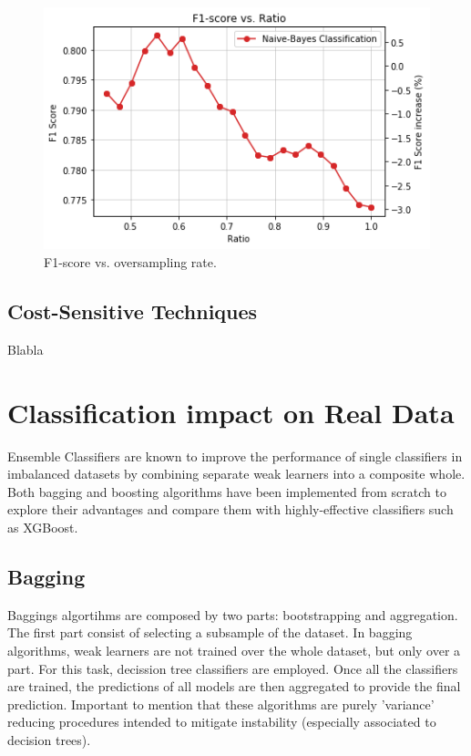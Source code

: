 \documentclass[conference]{IEEEtran}
\begin{document}
	\begin{figure}[h]
		\includegraphics[scale=0.3]{Oversampling_F1_Score}
		\centering
		\caption{F1-score vs. oversampling rate.}
		\label{fig:Oversampling_F1_Score}
	\end{figure}

	\subsection{Cost-Sensitive Techniques}
	Blabla

\section{Classification impact on Real Data}
Ensemble Classifiers are known to improve the performance of single classifiers in imbalanced datasets \cite{ensembles_review} by combining separate weak learners into a composite whole. Both bagging and boosting algorithms have been implemented from scratch to explore their advantages and compare them with highly-effective classifiers such as XGBoost. 

\subsection{Bagging}
Baggings algortihms are composed by two parts: bootstrapping and aggregation. The first part consist of selecting a subsample of the dataset. In bagging algorithms, weak learners are not trained over the whole dataset, but only over a part. For this task, decission tree classifiers are employed. Once all the classifiers are trained, the predictions of all models are then aggregated to provide the final prediction. Important to mention that these algorithms are purely 'variance' reducing procedures intended to mitigate instability (especially associated to decision trees). 
\end{document}
